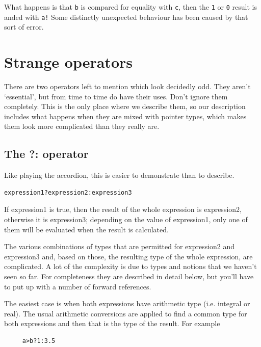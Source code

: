   What happens is that \texttt{b} is compared for equality with
   \texttt{c}, then the \texttt{1} or \texttt{0} result is anded
   with \texttt{a!} Some distinctly unexpected behaviour has been caused
   by that sort of error.


 
        \section{Strange operators}
        

  

  There are two operators left to mention which look decidedly odd. They
   aren't `essential', but from time to time do have their uses. Don't
   ignore them completely. This is the only place where we describe them, so
   our description includes what happens when they are mixed with pointer
   types, which makes them look more complicated than they really are.


  \subsection{The ?: operator}\label{subsec:ternaryOp}
   

   Like playing the accordion, this is easier to demonstrate than to
    describe.


   \begin{Verbatim}
expression1?expression2:expression3
\end{Verbatim}

   If expression1 is true, then the result of the whole
    expression is expression2, otherwise it is
    expression3; depending on the value of expression1,
    only one of them will be evaluated when the result is calculated.


   The various combinations of types that are permitted for
    expression2 and expression3 and, based on those, the
    resulting type of the whole expression, are complicated. A lot of the
    complexity is due to types and notions that we haven't seen so far. For
    completeness they are described in detail below, but you'll have to put up
    with a number of forward references.


   The easiest case is when both expressions have arithmetic type (i.e.
    integral or real). The usual arithmetic conversions are applied to find a
    common type for both expressions and then that is the type of the result.
    For example


   \begin{Verbatim}
     a>b?1:3.5
   \end{Verbatim}

